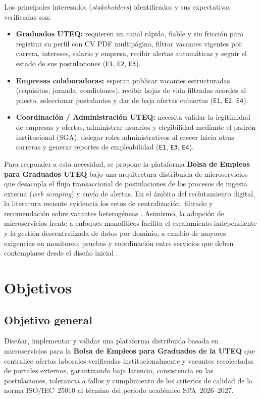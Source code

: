 \documentclass[11pt,a4paper]{article}
\begin{document}
Los principales interesados (\textit{stakeholders}) identificados y sus expectativas verificadas son:
\begin{itemize}
    \item \textbf{Graduados UTEQ:} requieren un canal rápido, fiable y sin fricción para registrar su perfil con CV PDF multipágina, filtrar vacantes vigentes por carrera, intereses, salario y empresa, recibir alertas automáticas y seguir el estado de sus postulaciones (\texttt{E1}, \texttt{E2}, \texttt{E3}).
    \item \textbf{Empresas colaboradoras:} esperan publicar vacantes estructuradas (requisitos, jornada, condiciones), recibir hojas de vida filtradas acordes al puesto, seleccionar postulantes y dar de baja ofertas cubiertas (\texttt{E1}, \texttt{E2}, \texttt{E4}).
    \item \textbf{Coordinación / Administración UTEQ:} necesita validar la legitimidad de empresas y ofertas, administrar usuarios y elegibilidad mediante el padrón institucional (SGA), delegar roles administrativos al crecer hacia otras carreras y generar reportes de empleabilidad (\texttt{E1}, \texttt{E3}, \texttt{E4}).
\end{itemize}

Para responder a esta necesidad, se propone la plataforma \textbf{Bolsa de Empleos para Graduados UTEQ} bajo una arquitectura distribuida de microservicios que desacopla el flujo transaccional de postulaciones de los procesos de ingesta externa (\textit{web scraping}) y envío de alertas. En el ámbito del reclutamiento digital, la literatura reciente evidencia los retos de centralización, filtrado y recomendación sobre vacantes heterogéneas \cite{freire2021,mashayekhi2024}. Asimismo, la adopción de microservicios frente a enfoques monolíticos facilita el escalamiento independiente y la gestión descentralizada de datos por dominio, a cambio de mayores exigencias en monitoreo, pruebas y coordinación entre servicios que deben contemplarse desde el diseño inicial \cite{blinowski2022,laigner2021,waseem2021}.

\section{Objetivos}

\subsection{Objetivo general}

Diseñar, implementar y validar una plataforma distribuida basada en microservicios para la \textbf{Bolsa de Empleos para Graduados de la UTEQ} que centralice ofertas laborales verificadas institucionalmente y vacantes recolectadas de portales externos, garantizando baja latencia, consistencia en las postulaciones, tolerancia a fallos y cumplimiento de los criterios de calidad de la norma ISO/IEC~25010 al término del periodo académico SPA~2026--2027.
\end{document}
